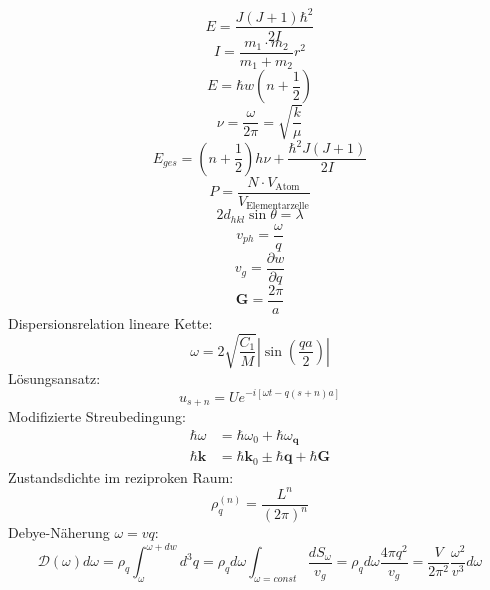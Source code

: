 \documentclass[11pt]{article}
\begin{document}
\begin{equation}
  E=\frac{J(J+1)\hbar^2}{2I}
\end{equation}
\begin{equation}
  I=\frac{m_1\cdot m_2}{m_1+m_2}{r^2}
\end{equation}
\begin{equation}
  E=\hbar w(n+\frac{1}{2})
\end{equation}
\begin{equation}
  \nu=\frac{\omega}{2\pi}=\sqrt{\frac{k}{\mu}}
\end{equation}
\begin{equation}
  E_{ges}=\left(n+\frac{1}{2}\right)h\nu+\frac{\hbar^2J(J+1)}{2I}
\end{equation}
\begin{equation}
  P=\frac{N\cdot V_{\text{Atom}}}{V_{\text{Elementarzelle}}}
\end{equation}
\begin{equation}
  2d_{hkl}\sin{\theta}=\lambda
\end{equation}
\begin{equation}
  v_{ph}=\frac{\omega}{q}
\end{equation}
\begin{equation}
  v_g=\frac{\partial w}{\partial q}
\end{equation}
\begin{equation}
  \bm{G}=\frac{2\pi}{a}
\end{equation}
Dispersionsrelation lineare Kette:
\begin{equation}
  \omega=2\sqrt{\frac{C_1}{M}}\left|\sin\left(\frac{qa}{2}\right)\right|
\end{equation}
Lösungsansatz:
\begin{equation}
  u_{s+n}=Ue^{-i[\omega t-q(s+n)a]}
\end{equation}
Modifizierte Streubedingung:
\begin{equation}
  \begin{align}
    \hbar\omega&=\hbar\omega_0+\hbar\omega_{\bm{q}}\\
    \hbar\bm{k}&=\hbar\bm{k}_0\pm\hbar\bm{q}+\hbar\bm{G}
  \end{align}
\end{equation}
Zustandsdichte im reziproken Raum:
\begin{equation}
  \rho_q^{(n)}=\frac{L^{n}}{(2\pi)^n}
\end{equation}
Debye-Näherung $\omega=vq$:
\begin{equation}
  \mathcal{D}(\omega)d\omega=\rho_q\int_\omega^{\omega+dw}d^3q=\rho_qd\omega
  \int_{\omega=const}\frac{dS_\omega}{v_g}=\rho_qd\omega\frac{4\pi q^2}{v_g}=
  \frac{V}{2\pi^2}\frac{\omega^2}{v^3}d\omega
\end{equation}
\end{document}
